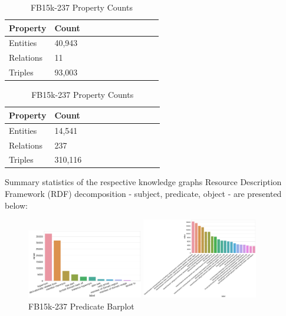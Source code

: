 \begin{table}[H]
	\parbox{.5\linewidth}{
		\caption{WN18RR Property Counts}
		\centering
		\begin{tabular}{lllllllllll}
  			\textbf{Property} & \textbf{Count}  \\
  			\hline
  			Entities & 40,943  \\
  			Relations & 11  \\
  			Triples & 93,003 \\
		\end{tabular}
		}
	\hfill
	\parbox{.5\linewidth}{
		\caption{FB15k-237 Property Counts}
		\centering
		\begin{tabular}{lllllllllll}
  			\textbf{Property} & \textbf{Count}  \\
  			\hline
  			Entities & 14,541   \\
  			Relations & 237  \\
  			Triples & 310,116  \\
		\end{tabular}
		}
\end{table}

Summary statistics of the respective knowledge graphs Resource Description Framework (RDF) decomposition - subject, predicate, object - are presented below:


\begin{figure}[H]
	\parbox{.5\linewidth}{
   		\caption{WN18RR Predicate Barplot}
   		\centering
    		\includegraphics[width=0.45\textwidth, height=0.2\textheight]{WN18RR_Predicate_Counts}
		}
	\hfill
	\parbox{.5\linewidth}{
		\caption{FB15k-237 Predicate Barplot}
   		\centering
		\includegraphics[width=0.45\textwidth, height=0.2\textheight]{FB15k-237_Predicate_Counts}
		}
\end{figure}

